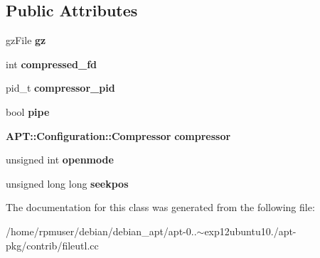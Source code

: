 \subsection*{\-Public \-Attributes}
\begin{DoxyCompactItemize}
\item 
gz\-File {\bfseries gz}\label{classFileFdPrivate_a3f64f8c1071dc4699b64f375ee1cd9f6}

\item 
int {\bfseries compressed\-\_\-fd}\label{classFileFdPrivate_afc2bbf0ae34544487358d9fbad6ed703}

\item 
pid\-\_\-t {\bfseries compressor\-\_\-pid}\label{classFileFdPrivate_ae42664a06a56dbcdda6d53cb81c3250f}

\item 
bool {\bfseries pipe}\label{classFileFdPrivate_a2b92649478c417988f390ef5e865bb2d}

\item 
{\bf \-A\-P\-T\-::\-Configuration\-::\-Compressor} {\bfseries compressor}\label{classFileFdPrivate_a130ebb4ca5e553e5acb9defdddf8272d}

\item 
unsigned int {\bfseries openmode}\label{classFileFdPrivate_a8b503e7e54ce041526dc7ab0305871db}

\item 
unsigned long long {\bfseries seekpos}\label{classFileFdPrivate_ab5d2c6998849e8cf76a581cd920e9583}

\end{DoxyCompactItemize}


\-The documentation for this class was generated from the following file\-:\begin{DoxyCompactItemize}
\item 
/home/rpmuser/debian/debian\-\_\-apt/apt-\/0..$\sim$exp12ubuntu10./apt-\/pkg/contrib/fileutl.\-cc\end{DoxyCompactItemize}
